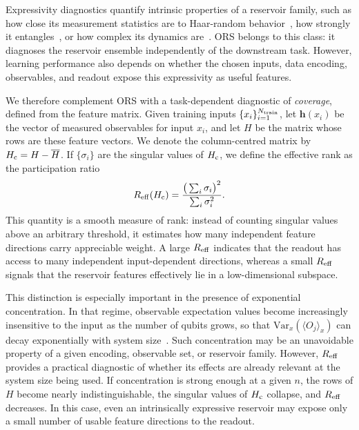 \documentclass[
    aps,
    pre,
    amsmath,
    amssymb,
    reprint,
    superscriptaddress,
    preprintnumbers,
]{revtex4-2}
\begin{document}
Expressivity diagnostics quantify intrinsic properties of a reservoir family, such as how close its measurement statistics are to Haar-random behavior~\cite{vallejos2021majorization}, how strongly it entangles~\cite{shaffer2014entanglement}, or how complex its dynamics are~\cite{domingo2024krylov}. ORS belongs to this class: it diagnoses the reservoir ensemble independently of the downstream task. However, learning performance also depends on whether the chosen inputs, data encoding, observables, and readout expose this expressivity as useful features.

We therefore complement ORS with a task-dependent diagnostic of \emph{coverage}, defined from the feature matrix. Given training inputs $\{x_i\}_{i=1}^{N_{\rm train}}$, let $\mathbf{h}(x_i)$ be the vector of measured observables for input $x_i$, and let $H$ be the matrix whose rows are these feature vectors. We denote the column-centred matrix by $H_{\rm c}=H-\overline{H}$. If $\{\sigma_i\}$ are the singular values of $H_{\rm c}$, we define the effective rank as the participation ratio
\begin{equation}
R_{\rm eff}(H_{\rm c})
=
\frac{\big(\sum_i \sigma_i\big)^2}{\sum_i \sigma_i^2}.
\label{eq:reff}
\end{equation}
This quantity is a smooth measure of rank: instead of counting singular values above an arbitrary threshold, it estimates how many independent feature directions carry appreciable weight. A large $R_{\rm eff}$ indicates that the readout has access to many independent input-dependent directions, whereas a small $R_{\rm eff}$ signals that the reservoir features effectively lie in a low-dimensional subspace.

This distinction is especially important in the presence of exponential concentration. In that regime, observable expectation values become increasingly insensitive to the input as the number of qubits grows, so that $\mathrm{Var}_x(\langle O_j\rangle_x)$ can decay exponentially with system size~\cite{xiong2024fundamental, sannia2025concentration}. Such concentration may be an unavoidable property of a given encoding, observable set, or reservoir family. However, $R_{\rm eff}$ provides a practical diagnostic of whether its effects are already relevant at the system size being used. If concentration is strong enough at a given $n$, the rows of $H$ become nearly indistinguishable, the singular values of $H_{\rm c}$ collapse, and $R_{\rm eff}$ decreases. In this case, even an intrinsically expressive reservoir may expose only a small number of usable feature directions to the readout.
\end{document}
